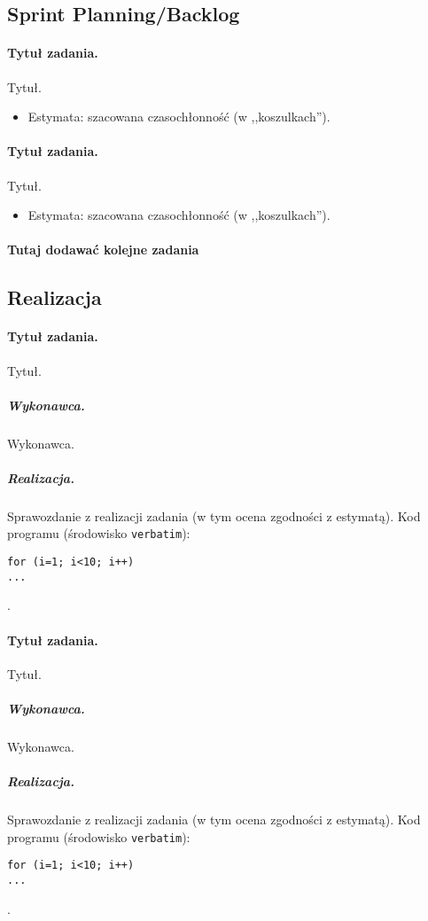 \documentclass[a4paper]{article}
\begin{document}
\subsection{Sprint Planning/Backlog}

\paragraph{Tytuł zadania.} Tytuł.
\begin{itemize}
\item Estymata: szacowana czasochłonność (w ,,koszulkach'').
\end{itemize}

\paragraph{Tytuł zadania.} Tytuł.
\begin{itemize}
\item Estymata: szacowana czasochłonność (w ,,koszulkach'').
\end{itemize}

\paragraph{Tutaj dodawać kolejne zadania}

\subsection{Realizacja}

\paragraph{Tytuł zadania.} Tytuł.
\subparagraph{Wykonawca.} Wykonawca.
\subparagraph{Realizacja.} Sprawozdanie z realizacji zadania (w tym ocena zgodności z estymatą). Kod programu (środowisko \texttt{verbatim}): \begin{verbatim}
for (i=1; i<10; i++)
...
\end{verbatim}.

\paragraph{Tytuł zadania.} Tytuł.
\subparagraph{Wykonawca.} Wykonawca.
\subparagraph{Realizacja.} Sprawozdanie z realizacji zadania (w tym ocena zgodności z estymatą). Kod programu (środowisko \texttt{verbatim}): \begin{verbatim}
for (i=1; i<10; i++)
...
\end{verbatim}.
\end{document}
